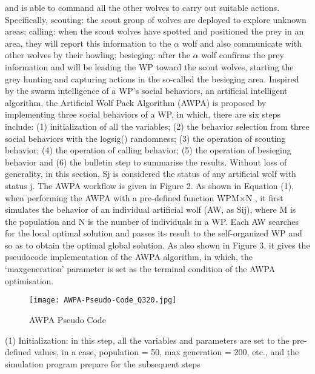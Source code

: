 \documentclass[conference]{IEEEtran}
\begin{document}
and is able to command all the other wolves to carry out
suitable actions. Specifically, scouting: the scout group of
wolves are deployed to explore unknown areas; calling: when
the scout wolves have spotted and positioned the prey in an
area, they will report this information to the $\alpha$ wolf and also
communicate with other wolves by their howling; besieging:
after the $\alpha$ wolf confirms the prey information and will be
leading the WP toward the scout wolves, starting the grey
hunting and capturing actions in the so-called the besieging
area.
Inspired by the swarm intelligence of a WP’s social behaviors, an artificial intelligent algorithm, the Artificial Wolf
Pack Algorithm (AWPA) is proposed by implementing three
social behaviors of a WP, in which, there are six steps include:
(1) initialization of all the variables; (2) the behavior selection
from three social behaviors with the logsig() randomness;
(3) the operation of scouting behavior; (4) the operation of
calling behavior; (5) the operation of besieging behavior and
(6) the bulletin step to summarise the results.
Without loss of generality, in this section, Sj is considered the status of any artificial wolf with status j.
The AWPA workflow is given in Figure 2. As shown in
Equation (1), when performing the AWPA with a pre-defined
function WPM×N , it first simulates the behavior of an individual artificial wolf (AW, as Sij), where M is the population and
N is the number of individuals in a WP. Each AW searches
for the local optimal solution and passes its result to the self-organized WP and so as to obtain the optimal global
solution.
As also shown in Figure 3, it gives the pseudocode implementation of the AWPA algorithm, in which, the ‘maxgeneration’ parameter is set as the terminal condition of the
AWPA optimisation.

\begin{figure}[H]
\centering
\begin{minipage}{0.4\textwidth}
    \texttt{[image: AWPA-Pseudo-Code\_Q320.jpg]}
    \caption{AWPA Pseudo Code}
\end{minipage}
\end{figure}

(1) Initialization: in this step, all the variables and parameters are set to the pre-defined values, in a case, population =
50, max generation = 200, etc., and the simulation program
prepare for the subsequent steps
\end{document}

